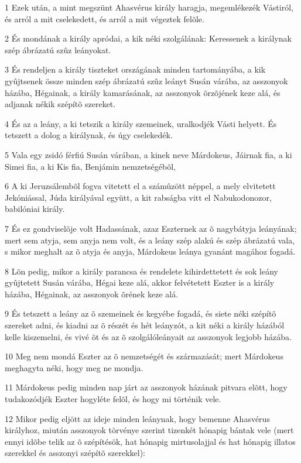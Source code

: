\par 1 Ezek után, a mint megszünt Ahasvérus király haragja, megemlékezék Vástiról, és arról a mit cselekedett, és arról a mit végeztek felõle.
\par 2 És mondának a király apródai, a kik néki szolgálának: Keressenek a királynak szép ábrázatú szûz leányokat.
\par 3 És rendeljen a király tiszteket országának minden tartományába, a kik gyûjtsenek össze minden szép ábrázatú szûz leányt Susán várába, az asszonyok házába, Hégainak, a király kamarásának, az asszonyok õrzõjének keze alá, és adjanak nékik szépítõ szereket.
\par 4 És az a leány, a ki tetszik a király szemeinek, uralkodjék Vásti helyett. És tetszett a dolog a királynak, és úgy cselekedék.
\par 5 Vala egy zsidó férfiú Susán várában, a kinek neve Márdokeus, Jáirnak fia, a ki Simei fia, a ki Kis fia, Benjámin nemzetségébõl,
\par 6 A ki Jeruzsálembõl fogva vitetett el a számûzött néppel, a mely elvitetett Jekóniással, Júda királyával együtt, a kit rabságba vitt el Nabukodonozor, babilóniai király.
\par 7 És ez gondviselõje volt Hadassának, azaz Eszternek az õ nagybátyja leányának; mert sem atyja, sem anyja nem volt, és a leány szép alakú és szép ábrázatú vala, s mikor meghalt az õ atyja és anyja, Márdokeus leánya gyanánt magához fogadá.
\par 8 Lõn pedig, mikor a király parancsa és rendelete kihirdettetett és sok leány gyûjtetett Susán várába, Hégai keze alá, akkor felvétetett Eszter is a király házába, Hégainak, az asszonyok õrének keze alá.
\par 9 És tetszett a leány az õ szemeinek és kegyébe fogadá, és siete néki szépítõ szereket adni, és kiadni az õ részét és hét leányzót, a kit néki a király házából kelle kiszemelni, és vivé õt és az õ szolgálóleányait az asszonyok legjobb házába.
\par 10 Meg nem mondá Eszter az õ nemzetségét és származását; mert Márdokeus meghagyta néki, hogy meg ne mondja.
\par 11 Márdokeus pedig minden nap járt az asszonyok házának pitvara elõtt, hogy tudakozódjék Eszter hogyléte felõl, és hogy mi történik vele.
\par 12 Mikor pedig eljött az ideje minden leánynak, hogy bemenne Ahasvérus királyhoz, miután asszonyok törvénye szerint tizenkét hónapig bántak vele (mert ennyi idõbe telik az õ szépítésök, hat hónapig mirtusolajjal és hat hónapig illatos szerekkel és asszonyi szépítõ szerekkel):
